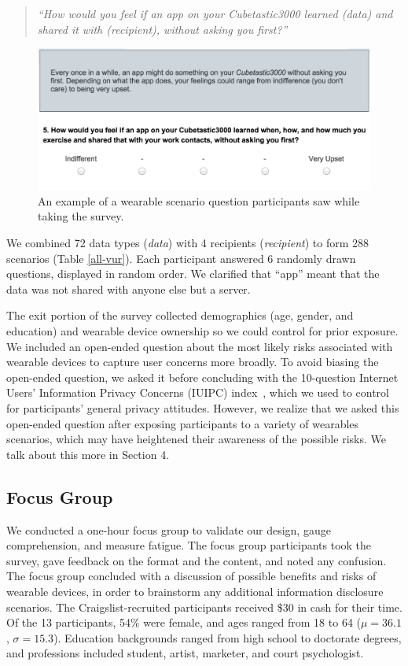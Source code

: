\documentclass[conference]{IEEEtran}
\begin{document}
\begin{quotation}
\noindent
\textit{``How would you feel if an app on your Cubetastic3000 learned (data) and shared it with (recipient), without asking you first?''}
\end{quotation}

\begin{figure}[t]
	\centering
	\includegraphics[width=\columnwidth]{prompt.png}
	\caption{An example of a wearable scenario question participants saw while taking the survey.}
	\label{fig:prompt}
\end{figure}

We combined 72 data types ({\it data}) with 4 recipients ({\it recipient}) to form 288 scenarios (Table \ref{all-vur}). Each participant answered 6 randomly drawn questions, displayed in random order. We clarified that ``app'' meant that the data was not shared with anyone else but a server. 

The exit portion of the survey collected demographics (age, gender, and education) and wearable device ownership so we could control for prior exposure. We included an open-ended question about the most likely risks associated with wearable devices to capture user concerns more broadly. To avoid biasing the open-ended question, we asked it before concluding with the 10-question Internet Users' Information Privacy Concerns (IUIPC) index~\cite{malhotra2004internet}, which we used to control for participants' general privacy attitudes. However, we realize that we asked this open-ended question after exposing participants to a variety of wearables scenarios, which may have heightened their awareness of the possible risks. We talk about this more in Section 4. 

\subsection{Focus Group}
We conducted a one-hour focus group to validate our design, gauge comprehension, and measure fatigue. The focus group participants took the survey, gave feedback on the format and the content, and noted any confusion. The focus group concluded with a discussion of possible benefits and risks of wearable devices, in order to brainstorm any additional information disclosure scenarios. The Craigslist-recruited participants received \$30 in cash for their time. Of the 13 participants, 54\% were female, and ages ranged from 18 to 64 ($\mu = 36.1$, $\sigma = 15.3$).  Education backgrounds ranged from high school to doctorate degrees, and professions included student, artist, marketer, and court psychologist.
\end{document}
